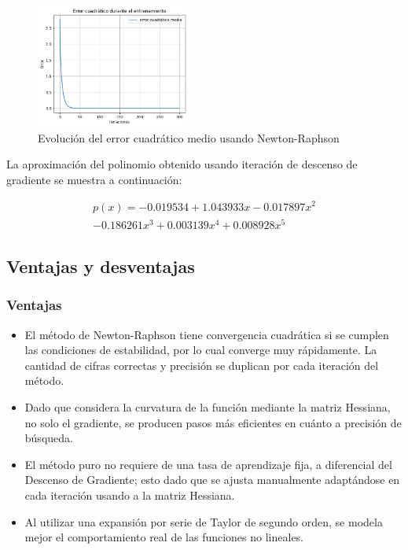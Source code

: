 \documentclass[conference]{IEEEtran}
\begin{document}
\begin{figure}[htbp]
\centerline{\includegraphics[width=0.45\textwidth]{fig4.png}}
\caption{Evolución del error cuadrático medio usando Newton-Raphson}
\label{newton-raphson-error}
\end{figure}

La aproximación del polinomio obtenido usando iteración de descenso de gradiente se muestra a continuación:

\begin{multline*}
    p(x) = -0.019534+1.043933x-0.017897x^{2} \\
    -0.186261x^{3}+0.003139x^{4}+0.008928x^{5}
\end{multline*}

\subsection{Ventajas y desventajas}

\subsubsection{Ventajas}
\begin{itemize}
    \item El método de Newton-Raphson tiene convergencia cuadrática si se cumplen las condiciones de estabilidad, por lo cual converge muy rápidamente. La cantidad de cifras correctas y precisión se duplican por cada iteración del método.  
    \item Dado que considera la curvatura de la función mediante la matriz Hessiana, no solo el gradiente, se producen pasos más eficientes en cuánto a precisión de búsqueda.
    \item El método puro no requiere de una tasa de aprendizaje fija, a diferencial del Descenso de Gradiente; esto dado que se ajusta manualmente adaptándose en cada iteración usando a la matriz Hessiana.
    \item Al utilizar una expansión por serie de Taylor de segundo orden, se modela mejor el comportamiento real de las funciones no lineales.
\end{itemize}
\end{document}
